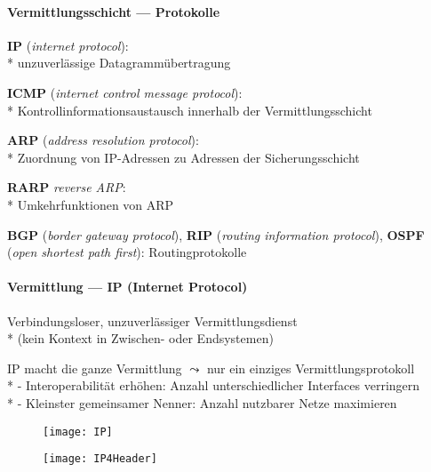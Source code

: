 \paragraph{Vermittlungsschicht --- Protokolle}
\begin{items}
  \item \textbf{IP} (\emph{internet protocol}): \\*
    unzuverlässige Datagrammübertragung
  \item \textbf{ICMP} (\emph{internet control message protocol}): \\*
    Kontrollinformationsaustausch innerhalb der Vermittlungsschicht
  \item \textbf{ARP} (\emph{address resolution protocol}): \\*
    Zuordnung von IP-Adressen zu Adressen der Sicherungsschicht
  \item \textbf{RARP} \emph{reverse ARP}: \\*
    Umkehrfunktionen von ARP
  \item \textbf{BGP} (\emph{border gateway protocol}), \textbf{RIP} (\emph{routing information protocol}), \textbf{OSPF} (\emph{open shortest path first}): Routingprotokolle
\end{items}

\paragraph{Vermittlung --- IP (Internet Protocol)}
\begin{items}
	\item Verbindungsloser, unzuverlässiger Vermittlungsdienst\\*
	 	(kein Kontext in Zwischen- oder Endsystemen)
  \item IP macht die ganze Vermittlung \( \leadsto \) nur ein einziges Vermittlungsprotokoll \\*
    - Interoperabilität erhöhen: Anzahl unterschiedlicher Interfaces verringern \\*
    - Kleinster gemeinsamer Nenner: Anzahl nutzbarer Netze maximieren
\end{items}
\begin{figure}[H]\centering\label{IP}\texttt{[image: IP]}\end{figure}
\begin{figure}[H]\centering\texttt{[image: IP4Header]}\end{figure}

